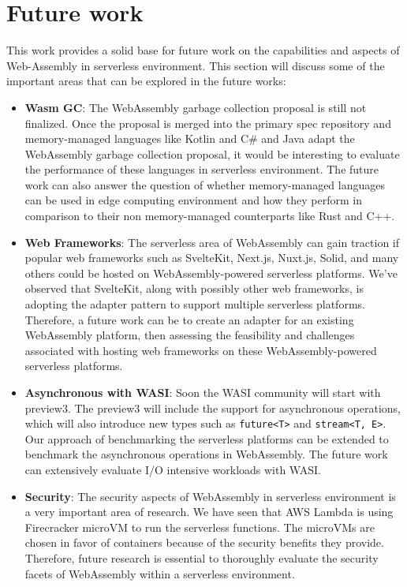 \chapter{Future work}
\label{chap:future-work}

This work provides a solid base for future work on the capabilities and aspects of Web-Assembly in \gls{serverless} environment. This section will discuss some of the important areas that can be explored in the future works:
\begin{itemize}
    \item \textbf{Wasm GC}: The WebAssembly garbage collection proposal is still not finalized. Once the proposal is merged into the primary spec repository and memory-managed languages like Kotlin and C\# and Java adapt the WebAssembly garbage collection proposal, it would be interesting to evaluate the performance of these languages in serverless environment. The future work can also answer the question of whether memory-managed languages can be used in edge computing environment and how they perform in comparison to their non memory-managed counterparts like Rust and C++.
    \item \textbf{Web Frameworks}: The serverless area of WebAssembly can gain traction if popular web frameworks such as SvelteKit, Next.js, Nuxt.js, Solid, and many others could be hosted on WebAssembly-powered serverless platforms. We've observed that SvelteKit, along with possibly other web frameworks, is adopting the adapter pattern \cite{sveltecommunity_2023_adapter} to support multiple serverless platforms. Therefore, a future work can be to create an adapter for an existing WebAssembly platform, then assessing the feasibility and challenges associated with hosting web frameworks on these WebAssembly-powered serverless platforms.
    \item \textbf{Asynchronous with WASI}: Soon the WASI community will start with preview3. The preview3 \cite{gohman_2023_wasi} will include the support for asynchronous operations, which will also introduce new types such as \texttt{future<T>} and \texttt{stream<T, E>}. Our approach of benchmarking the serverless platforms can be extended to benchmark the asynchronous operations in WebAssembly. The future work can extensively evaluate I/O intensive workloads with WASI.
    \item \textbf{Security}: The security aspects of WebAssembly in serverless environment is a very important area of research. We have seen that AWS Lambda is using Firecracker microVM to run the serverless functions. The microVMs are chosen in favor of containers because of the security benefits they provide. Therefore, future research is essential to thoroughly evaluate the security facets of WebAssembly within a serverless environment.
\end{itemize}
